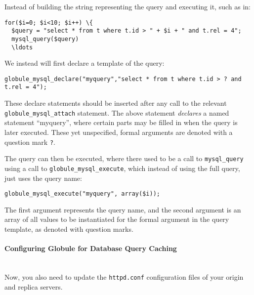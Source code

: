 \documentclass[10pt,a4paper]{article}
\makeatletter
\newenvironment{p}{\@open{P}{}}{\@close{P}}
\newenvironment{p}{}{\par}
\makeatother
\begin{document}
\begin{p}
Instead of building the string representing the query and executing
it, such as in:
\end{p}

\begin{Verbatim}
for($i=0; $i<10; $i++) \{
  $query = "select * from t where t.id > " + $i + " and t.rel = 4";
  mysql_query($query)
  \ldots
\end{Verbatim}

\begin{p}
We instead will first declare a template of the query:
\end{p}

\begin{Verbatim}
globule_mysql_declare("myquery","select * from t where t.id > ? and t.rel = 4");
\end{Verbatim}

\begin{p}
These declare statements should be inserted after any call to the relevant
\texttt{globule\_mysql\_attach} statement.  The above statement \emph{declares}
a named statement ``myquery'', where certain parts may be filled in when the
query is later executed.  These yet unspecified, formal arguments are denoted
with a question mark \verb!?!.
\end{p}

\begin{p}
The query can then be executed, where there used to be a call to
\texttt{mysql\_query} using a call to \texttt{globule\_mysql\_execute}, which
instead of using the full query, just uses the query name:
\end{p}

\begin{Verbatim}
globule_mysql_execute("myquery", array($i));
\end{Verbatim}

\begin{p}
The first argument represents the query name, and the second argument is an
array of all values to be instantiated for the formal argument in the query
template, as denoted with question marks.
\end{p}

\paragraph{Configuring Globule for Database Query Caching}~\\

\begin{p}
Now, you also need to update the \verb!httpd.conf! configuration files
of your origin and replica servers.
\end{p}
\end{document}
